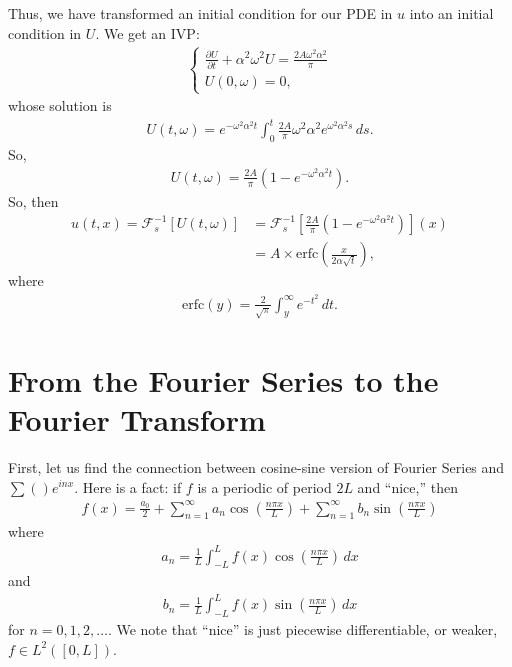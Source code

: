 \documentclass{book}
\theoremstyle{definition}
\newcommand{\p}{\partial}
\newcommand{\F}{\mathcal{F}}
\begin{document}
Thus, we have transformed an initial condition for our PDE in $u$ into an initial condition in $U$. We get an IVP:
\begin{align*}
\begin{cases}
\frac{\p U}{\p t} + \alpha^2\omega^2 U = \frac{2A\omega^2\alpha^2}{\pi}\\
U(0,\omega) = 0,
\end{cases}
\end{align*}
whose solution is
\begin{align*}
U(t,\omega) = e^{-\omega^2\alpha^2t}\int^t_0\frac{2A}{\pi}\omega^2\alpha^2e^{\omega^2\alpha^2s}\,ds.
\end{align*}
So,
\begin{align*}
U(t,\omega) = \frac{2A}{\pi}\left(1 - e^{-\omega^2\alpha^2 t}\right).
\end{align*}
So, then
\begin{align*}
u(t,x) = \F_s^{-1}[U(t,\omega)] &= \F_s^{-1}\left[ \frac{2A}{\pi}\left(1 - e^{-\omega^2\alpha^2 t}\right) \right](x)\\
&= A\times \text{erfc}\left(\frac{x}{2\alpha\sqrt{t}}\right),
\end{align*}
where 
\begin{align*}
\text{erfc}(y) = \frac{2}{\sqrt{\pi}}\int^\infty_y e^{-t^2}\,dt.
\end{align*}





\section{From the Fourier Series to the Fourier Transform}
First, let us find the connection between cosine-sine version of Fourier Series and $\sum () e^{inx}$. Here is a fact: if $f$ is a periodic of period $2L$ and ``nice,'' then
\begin{align*}
f(x) = \frac{a_0}{2} + \sum^\infty_{n=1}a_n\cos\left(\frac{n\pi x}{L}\right) + \sum^\infty_{n=1}b_n\sin\left(\frac{n\pi x}{L}\right) 
\end{align*}
where
\begin{align*}
a_n = \frac{1}{L}\int^L_{-L}f(x)\cos\left(\frac{n\pi x}{L}\right)\,dx
\end{align*}
and
\begin{align*}
b_n = \frac{1}{L}\int^L_{-L}f(x)\sin\left(\frac{n\pi x}{L}\right)\,dx
\end{align*}
for $n=0,1,2,\dots$. We note that ``nice'' is just piecewise differentiable, or weaker, $f \in L^2([0,L])$. \\
\end{document}

